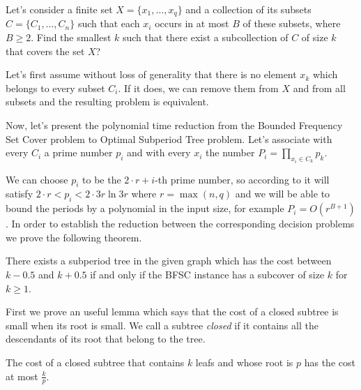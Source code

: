 \begin{problem} Let's consider a finite set $X=\{x_1,\ldots,x_q\}$ and a collection of its subsets $C=\{C_1,\ldots, C_n\}$ such that each $x_i$ occurs in at most $B$ of these subsets, where $B \geq 2$. Find the smallest $k$ such that there exist a subcollection of $C$ of size $k$ that covers the set $X$?
\end{problem}

Let's first assume without loss of generality that there is no element $x_k$ which belongs to every subset $C_i$. If it does, we can remove them from $X$ and from all subsets and the resulting problem is equivalent.

Now, let's present the polynomial time reduction from the Bounded Frequency Set Cover problem to Optimal Subperiod Tree problem. Let's associate with every $C_i$ a prime number $p_i$ and with every $x_i$ the number $P_i=\prod_{x_i\in C_k}p_k$.

We can choose $p_i$ to be the $2\cdot r+i$-th prime number, so according to \citep{jaroma2005upper} it will satisfy $2\cdot r <p_i<2\cdot 3r \ln 3r$ where $r=\max(n, q)$ and we will be able to bound the periods by a polynomial in the input size, for example $P_i=O(r^{B+1})$. In order to establish the reduction between the corresponding decision problems we prove the following theorem. 

\begin{theorem}\label{theorem}
There exists a subperiod tree in the given graph which has the cost between $k-0.5$ and $k+0.5$ if and only if the BFSC instance has a subcover of size $k$ for $k \ge  1$.
\end{theorem}

First we prove an useful lemma which says that the cost of a closed subtree is small when its root is small. We call a subtree \emph{closed} if it contains all the descendants of its root that belong to the tree. 

\begin{lemma}\label{lemma1}
The cost of a closed subtree that contains $k$ leafs and whose root is $p$ has the cost at most $\frac{k}{p}$.
\end{lemma}

